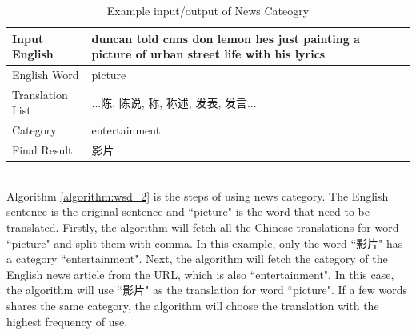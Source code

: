 \begin{CJK}{UTF8}{gbsn}
\begin{algorithm}[ht]
\begin{algorithmic}
\end{algorithmic}
\end{algorithm}
\begin{table}[ht]
    \caption{Example input/output of News Cateogry}
    \begin{center}
    \begin{tabular}{| p{2.5cm} | p{4cm} |}
        \hline
        Input English & duncan told cnns don lemon hes just painting a picture of urban street life with his lyrics\\
        \hline
        English Word & picture \\
        \hline
        Translation List & \parbox[t]{4cm}{...陈, 陈说, 称, 称述, 发表, 发言...}\\
        \hline        
        Category & entertainment\\
        \hline
        Final Result & 影片\\
        \hline
    \end{tabular}
    \end{center}
\end{table}
\\
Algorithm \ref{algorithm:wsd_2} is the steps of using news category. The English sentence is the original sentence and ``picture" is the word that need to be translated. Firstly, the algorithm will fetch all the Chinese translations for word ``picture" and split them with comma. In this example, only the word ``影片" has a category ``entertainment". Next, the algorithm will fetch the category of the English news article from the URL, which is also ``entertainment".
In this case, the algorithm will use ``影片" as the translation for word ``picture". If a few words shares the same category, the algorithm will choose the translation with the highest frequency of use.
\end{CJK}